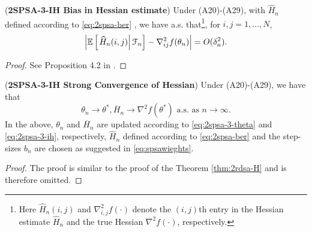 \begin{lemma}(\textbf{2SPSA-3-IH Bias in Hessian estimate})
\label{lemma:2spsa-bias}
Under (A20)-(A29), with $\widehat H_n$ defined according to  \eqref{eq:2spsa-ber} , we have a.s. that\footnote{Here $\widehat H_n(i,j)$ and $\nabla^2_{i,j}f(\cdot)$ denote the $(i,j)$th entry in the Hessian estimate $\widehat H_n$ and the true Hessian $\nabla^2 f(\cdot)$, respectively.}, for $i,j = 1,\ldots,N$,
\begin{align}
\left|\mathbb{E}\left[
\left. \widehat H_n(i,j) \right| \mathcal{F}_n \right] - \nabla^2_{ij} f(\theta_n)\right| = O(\delta_n^2).
\end{align} 
\end{lemma}
\begin{proof}
See Proposition 4.2 in \cite{bhatnagar2015simultaneous}.
\end{proof}


\begin{theorem}(\textbf{2SPSA-3-IH Strong Convergence of Hessian})
\label{thm:2spsa-H}
Under (A20)-(A29), we have that 
$$\theta_n \rightarrow \theta^*, \overline H_n \rightarrow \nabla^2 f(\theta^*) \text{ a.s. as } n\rightarrow \infty.$$ 
In the above, $\theta_n$ and $\overline H_n$ are updated according to \eqref{eq:2spsa-3-theta} and \eqref{eq:2spsa-3-ih}, respectively, $\widehat H_n$ defined according to \eqref{eq:2spsa-ber} and the step-sizes $b_n$ are chosen as suggested in \eqref{eq:spsawieghts}. 
\end{theorem}
\begin{proof}
The proof is similar to the proof of the Theorem \ref{thm:2rdsa-H} and is therefore omitted.
\end{proof}

